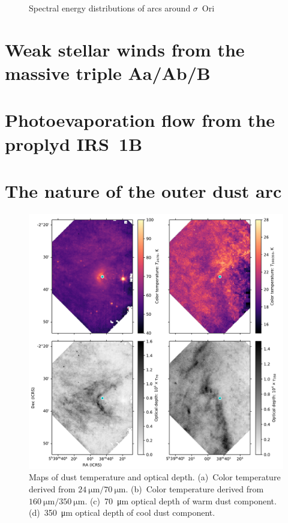 \documentclass[useAMS, usenatbib, a4paper]{mnras}
\begin{document}
\begin{figure}
  \centering
  \caption{Spectral energy distributions of arcs around $\sigma$~Ori}
  \label{fig:sig-ori-SED}
\end{figure}



\section{Weak stellar winds from the massive triple Aa/Ab/B}
\label{sec:stellar-winds-AB}

\section{Photoevaporation flow from the proplyd IRS~1B}
\label{sec:phot-flow-from}

\section{The nature of the outer dust arc}

\begin{figure}
  \includegraphics[width=\linewidth]{figs/sigma-ori-multi-Tcol-tau}
  \caption{Maps of dust temperature and optical depth. (a)~Color
    temperature derived from \(\SI{24}{\um} /
    \SI{70}{\um}\). (b)~Color temperature derived from
    \(\SI{160}{\um} / \SI{350}{\um}\). (c)~\SI{70}{\um} optical depth
    of warm dust component. (d)~\SI{350}{\um} optical depth of cool
    dust component.}
  \label{fig:N-T-distro}
\end{figure}
\end{document}
